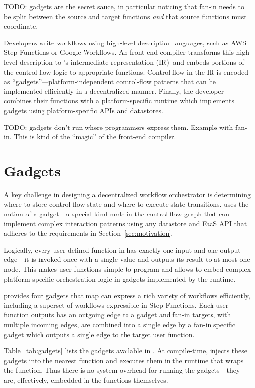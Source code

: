 TODO: gadgets are the secret sauce, in particular noticing that fan-in needs to
be split between the source and target functions \emph{and} that source
functions must coordinate.

Developers write workflows using high-level description languages, such as AWS
Step Functions or Google Workflows. An \name{} front-end compiler transforms
this high-level description to \name{}'s intermediate representation (IR), and
embeds portions of the control-flow logic to appropriate functions. Control-flow
in the IR is encoded as ``gadgets''---platform-independent control-flow patterns
that can be implemented efficiently in a decentralized manner. Finally, the
developer combines their functions with a platform-specific \name{} runtime
which implements gadgets using platform-specific APIs and datastores.

TODO: gadgets don't run where programmers express them. Example with fan-in.
This is kind of the ``magic'' of the front-end compiler.

\section{Gadgets}\label{sec:gadgets}

A key challenge in designing a decentralized workflow orchestrator is
determining where to store control-flow state and where to execute
state-transitions. \name{} uses the notion of a gadget---a special kind node in
the control-flow graph that can implement complex interaction patterns using any
datastore and FaaS API that adheres to the requirements in
Section~\ref{sec:motivation}.

Logically, every user-defined function in \name{} has exactly one input and one
output edge---it is invoked once with a single value and outputs its result to
at most one node. This makes user functions simple to program and allows \name{}
to embed complex platform-specific orchestration logic in gadgets implemented by
the runtime.

\name{} provides four gadgets that map can express a rich variety of workflows
efficiently, including a superset of workflows expressible in Step Functions.
Each user function outputs has an outgoing edge to a gadget and fan-in targets,
with multiple incoming edges, are combined into a single edge by a fan-in
specific gadget which outputs a single edge to the target user function.

Table~\ref{tab:gadgets} lists the gadgets available in \name{}.  At
compile-time, \name{} injects these gadgets into the nearest function and
executes them in the \name{} runtime that wraps the function. Thus there is no
system overhead for running the gadgets---they are, effectively, embedded in
the functions themselves.

